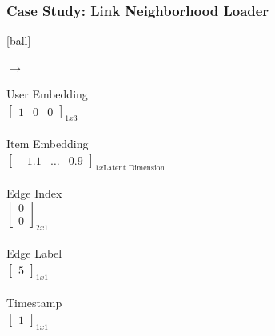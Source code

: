 \documentclass{beamer}
\begin{document}
\begin{frame}[fragile]
\frametitle{Case Study: Link Neighborhood Loader}
[ball]

\begin{minipage}[c]{0.3\textwidth}
    \hspace{1cm}
    
\end{minipage}
\hfill
\begin{minipage}[c]{0.1\textwidth}
    \hspace{1cm}
    $\to$
\end{minipage}
\hfill
\begin{minipage}[c]{0.5\textwidth}
    User Embedding \\ 
    $\begin{bmatrix}
    1 & 0 & 0 
    \end{bmatrix}_{1x3}$ \\~\\
    Item Embedding \\ 
    $\begin{bmatrix}
    -1.1 & \ldots & 0.9
    \end{bmatrix}_{1x \text{Latent Dimension}}$ \\~\\
    Edge Index \\
    $\begin{bmatrix}
    0 \\
    0
    \end{bmatrix}_{2x1}$ \\~\\
    Edge Label \\ 
    $\begin{bmatrix}
    5 
    \end{bmatrix}_{1x1}$ \\~\\
    Timestamp \\ 
    $\begin{bmatrix}
    1 
    \end{bmatrix}_{1x1}$
\end{minipage}
\end{frame}

\end{document}
